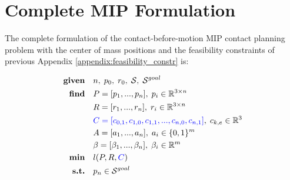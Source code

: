 \section{Complete MIP Formulation \label{appendix:complete_mip_formulation}}
The complete formulation of the contact-before-motion MIP contact planning problem with the center of mass positions and the feasibility constraints of previous Appendix \ref{appendix:feasibility_constr} is:

\begin{align}
    \textrm{\textbf{given}} %
                            \quad & n, \; p_0, \; r_0, \; \mathcal{S}, \; \mathcal{S}^{goal} \nonumber\\
    \textrm{\textbf{find}}  \quad & P=[p_1,...,p_n], \; p_i \in \mathbb{R}^{3 \times n} \nonumber\\
                            \quad & R=[r_1,...,r_n], \; r_i \in \mathbb{R}^{3 \times n} \nonumber\\
                            \quad & \textcolor{blue}{C=[c_{0,1},c_{1,0},c_{1,1},...,c_{n,0},c_{n,1}]}, \; c_{k,e} \in \mathbb{R}^3 \nonumber\\
                            \quad & A=[a_1,...,a_n], \; a_i \in \{0,1\}^{m} \nonumber\\
                            \quad & \beta=[\beta_1,...,\beta_n], \; \beta_i \in \mathbb{R}^{m} \nonumber\\
    \textrm{\textbf{min}}  \quad & l(P,R,\textcolor{blue}{C}) \nonumber\\
    \textrm{\textbf{s.t.}}  \quad & p_n \in \mathcal{S}^{goal} \nonumber\\

\end{align}
